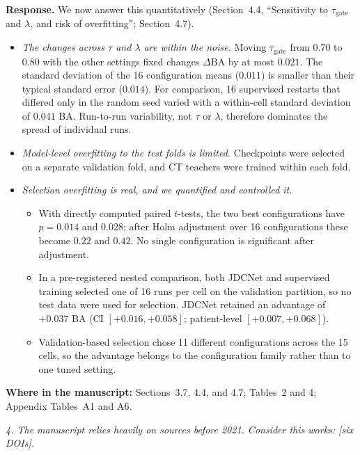\documentclass[11pt]{article}
\newenvironment{rcomment}{\par\noindent\begin{minipage}{\linewidth}\itshape\color{black!75}}{\end{minipage}\par}
\newcommand{\where}[1]{\par\noindent\textbf{Where in the manuscript:} #1\par}
\begin{document}
\textbf{Response.} We now answer this quantitatively (Section~4.4, ``Sensitivity to $\tau_{\mathrm{gate}}$ and $\lambda$, and risk of overfitting''; Section~4.7).
\begin{itemize}[leftmargin=1.4em]
  \item \emph{The changes across $\tau$ and $\lambda$ are within the noise.} Moving $\tau_{\mathrm{gate}}$ from 0.70 to 0.80 with the other settings fixed changes $\Delta\mathrm{BA}$ by at most $0.021$. The standard deviation of the 16 configuration means ($0.011$) is smaller than their typical standard error ($0.014$). For comparison, 16 supervised restarts that differed only in the random seed varied with a within-cell standard deviation of $0.041$ BA. Run-to-run variability, not $\tau$ or $\lambda$, therefore dominates the spread of individual runs.
  \item \emph{Model-level overfitting to the test folds is limited.} Checkpoints were selected on a separate validation fold, and CT teachers were trained within each fold.
  \item \emph{Selection overfitting is real, and we quantified and controlled it.}
  \begin{itemize}[leftmargin=1.2em]
    \item With directly computed paired $t$-tests, the two best configurations have $p=0.014$ and $0.028$; after Holm adjustment over 16 configurations these become $0.22$ and $0.42$. No single configuration is significant after adjustment.
    \item In a pre-registered nested comparison, both JDCNet and supervised training selected one of 16 runs per cell on the validation partition, so no test data were used for selection. JDCNet retained an advantage of $+0.037$ BA (CI $[+0.016,+0.058]$; patient-level $[+0.007,+0.068]$).
    \item Validation-based selection chose 11 different configurations across the 15 cells, so the advantage belongs to the configuration family rather than to one tuned setting.
  \end{itemize}
\end{itemize}
\where{Sections~3.7, 4.4, and 4.7; Tables~2 and 4; Appendix Tables~A1 and A6.}

\begin{rcomment}
4. The manuscript relies heavily on sources before 2021. Consider this works: [six DOIs].
\end{rcomment}
\end{document}
